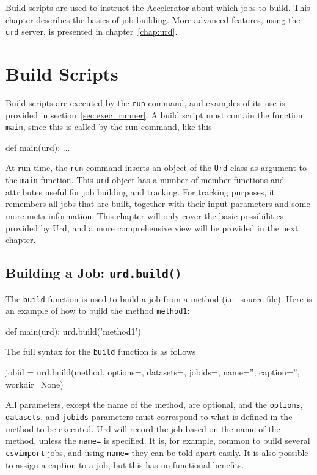 \label{chap:urd_basic}

Build scripts are used to instruct the Accelerator about which jobs to
build.  This chapter describes the basics of job building.  More
advanced features, using the \texttt{urd} server, is presented in
chapter~\ref{chap:urd}.



\section{Build Scripts}
Build scripts are executed by the \texttt{run} command, and examples
of its use is provided in section~\ref{sec:exec_runner}.  A build
script must contain the function \texttt{main}, since this is called
by the run command, like this
\begin{python}
def main(urd):
    ...
\end{python}
At run time, the \texttt{run} command inserts an object of
the \texttt{Urd} class as argument to the \texttt{main} function.
This \texttt{urd} object has a number of member functions and
attributes useful for job building and tracking.  For tracking
purposes, it remembers all jobs that are built, together with their
input parameters and some more meta information.  This chapter will
only cover the basic possibilities provided by Urd, and a more
comprehensive view will be provided in the next chapter.



\subsection{Building a Job: \texttt{urd.build()}}
The \texttt{build} function is used to build a job from a method
(i.e.\ source file).  Here is an example of how to build the method
\texttt{method1}:
\begin{python}
def main(urd):
    urd.build('method1')
\end{python}
The full syntax for the \texttt{build} function is as follows
\begin{python}
jobid = urd.build(method,
                  options={}, datasets={}, jobids={},
                  name='', caption='', workdir=None)
\end{python}
All parameters, except the name of the method, are optional, and
the \texttt{options}, \texttt{datasets}, and \texttt{jobids}
parameters must correspond to what is defined in the method to be
executed.  Urd will record the job based on the name of the method,
unless the \texttt{name=} is specified.  It is, for example, common to
build several \texttt{csvimport} jobs, and using \texttt{name=} they
can be told apart easily.  It is also possible to assign a caption to
a job, but this has no functional benefits.

